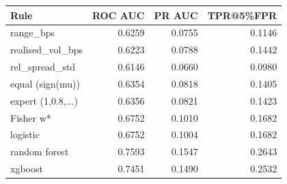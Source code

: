 \begin{tabular}{lrrr}
\toprule
Rule & ROC AUC & PR AUC & TPR@5\%FPR \\
\midrule
range\_bps & 0.6259 & 0.0755 & 0.1146 \\
realised\_vol\_bps & 0.6223 & 0.0788 & 0.1442 \\
rel\_spread\_std & 0.6146 & 0.0660 & 0.0980 \\
\addlinespace[2pt]
equal (sign(mu)) & 0.6354 & 0.0818 & 0.1405 \\
expert (1,0.8,...) & 0.6356 & 0.0821 & 0.1423 \\
\addlinespace[2pt]
Fisher w* & 0.6752 & 0.1010 & 0.1682 \\
\addlinespace[2pt]
logistic & 0.6752 & 0.1004 & 0.1682 \\
random forest & 0.7593 & 0.1547 & 0.2643 \\
xgboost & 0.7451 & 0.1490 & 0.2532 \\
\bottomrule
\end{tabular}